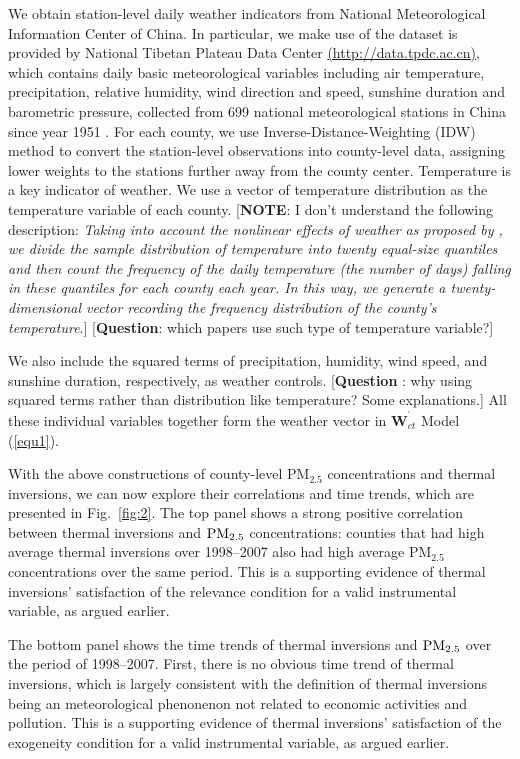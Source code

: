 \documentclass[12pt]{article}
\begin{document}
We obtain station-level daily weather indicators from National
Meteorological Information Center of China. In particular, we make use of
the dataset is provided by National Tibetan Plateau Data Center %
\url{(http://data.tpdc.ac.cn)}, which contains daily basic meteorological
variables including air temperature, precipitation, relative humidity, wind
direction and speed, sunshine duration and barometric pressure, collected
from 699 national meteorological stations in China since year 1951 %
\citep{Dailymeteorologicaldataset}. For each county, we use
Inverse-Distance-Weighting (IDW) method to convert the station-level
observations into county-level data, assigning lower weights to the stations
further away from the county center. Temperature is a key indicator of
weather. We use a vector of temperature distribution as the temperature
variable of each county. [\textbf{NOTE}: I don't understand the following
description: \emph{Taking into account the nonlinear effects of weather as
proposed by \citep{deschenes2017defensive}, we divide the sample
distribution of temperature into twenty equal-size quantiles and then count
the frequency of the daily temperature (the number of days) falling in these
quantiles for each county each year. In this way, we generate a
twenty-dimensional vector recording the frequency distribution of the
county's temperature}.] [\textbf{Question}: which papers use such type of
temperature variable?]

We also include the squared terms of precipitation, humidity, wind speed,
and sunshine duration, respectively, as weather controls. [\textbf{Question}%
: why using squared terms rather than distribution like temperature? Some
explanations.] All these individual variables together form the weather
vector in $\mathbf{W}_{ct}^{^{\prime }}$ Model (\ref{equ1}).

With the above constructions of county-level $\mathrm{PM_{2.5}}$
concentrations and thermal inversions, we can now explore their correlations
and time trends, which are presented in Fig.~\ref{fig:2}. The top panel
shows a strong positive correlation between thermal inversions and $\mathrm{%
PM_{2.5}}$ concentrations: counties that had high average thermal inversions
over 1998--2007 also had high average $\mathrm{PM_{2.5}}$ concentrations
over the same period. This is a supporting evidence of thermal inversions'
satisfaction of the relevance condition for a valid instrumental variable,
as argued earlier.

The bottom panel shows the time trends of thermal inversions and $\mathrm{%
PM_{2.5}}$ over the period of 1998--2007. First, there is no obvious time
trend of thermal inversions, which is largely consistent with the definition
of thermal inversions being an meteorological phenonenon not related to
economic activities and pollution. This is a supporting evidence of thermal
inversions' satisfaction of the exogeneity condition for a valid
instrumental variable, as argued earlier.
\end{document}
